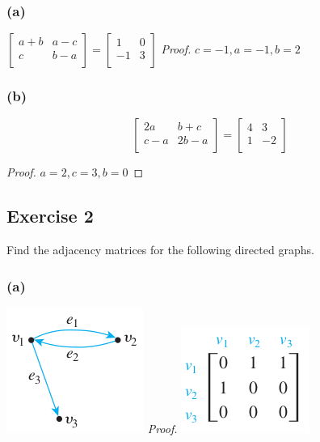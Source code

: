 \documentclass[14pt]{extarticle}
\begin{document}
\subsubsection{(a)}
\(
\left[
    \begin{array}{cc}
        a + b & a - c \\
        c     & b - a \\
    \end{array}
    \right] =
\left[
    \begin{array}{rr}
        1  & 0 \\
        -1 & 3 \\
    \end{array}
    \right]
\)
{\it Proof.} \(c=-1, a=-1, b=2\)

\subsubsection{(b)}
\[
    \left[
        \begin{array}{cc}
            2a    & b + c  \\
            c - a & 2b - a \\
        \end{array}
        \right] =
    \left[
        \begin{array}{rr}
            4 & 3  \\
            1 & -2 \\
        \end{array}
        \right]
\]
\begin{proof}
    \(a=2, c=3, b=0\)
\end{proof}

\subsection{Exercise 2}
Find the adjacency matrices for the following directed graphs.

\subsubsection{(a)}
\includegraphics[scale=0.6]{../images/10.2.2.a.1.png}
{\it Proof.}
\includegraphics[scale=0.6]{../images/10.2.2.a.png}
\end{document}
